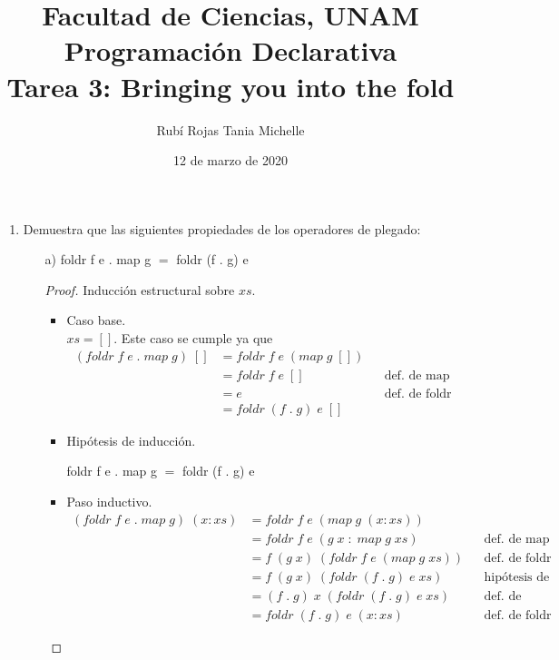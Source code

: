 \documentclass[letterpaper,11pt]{article}
\title{Facultad de Ciencias, UNAM \\
       Programación Declarativa \\ 
       Tarea 3: Bringing you into the fold}
\author{Rubí Rojas Tania Michelle}
\date{12 de marzo de 2020}
\begin{document}
\maketitle
\begin{enumerate}
    \item Demuestra que las siguientes propiedades de los operadores de plegado:
    \begin{itemize}
        \item[a)] foldr f e . map g $=$ foldr (f . g) e
        \begin{proof}
            Inducción estructural sobre $xs$.
            \begin{itemize}
                \item Caso base. \\ 
                $xs = []$. Este caso se cumple ya que 
                \begin{align*}
                    (foldr \; f \; e \; . \; map \; g) \; []
                    &= foldr \; f \; e \; (map \; g \; []) \\ 
                    &= foldr \; f \; e \; []
                    && \text{def. de map} \\ 
                    &= e
                    && \text{def. de foldr} \\ 
                    &= foldr \; (f \; . \; g) \; e \; []
                \end{align*}

                \item Hipótesis de inducción.
                \begin{center}
                    foldr f e . map g $=$ foldr (f . g) e
                \end{center}
                
                \item Paso inductivo.
                \begin{align*}
                    (foldr \; f \; e \; . \; map \; g) \; (x:xs)
                    &= foldr \; f \; e \; (map \; g \; (x:xs)) \\
                    &= foldr \; f \; e \; (g \; x \; : \; map \; g \; xs)
                    && \text{def. de map} \\ 
                    &= f \; (g \; x) \; (foldr \; f \; e \; (map \; g \; xs))
                    && \text{def. de foldr} \\ 
                    &= f \; (g \; x) \; (foldr \; (f \; . \; g) \; e \; xs)
                    && \text{hipótesis de inducción} \\ 
                    &= (f \; . \; g) \; x \; (foldr \; (f \; . \; g) \; e \; xs)
                    && \text{def. de composición} \\ 
                    &= foldr \; (f \; . \; g) \; e \; (x:xs)
                    && \text{def. de foldr} 
                \end{align*}
            \end{itemize}
        \end{proof}


\end{itemize}
\end{enumerate}
\end{document}
